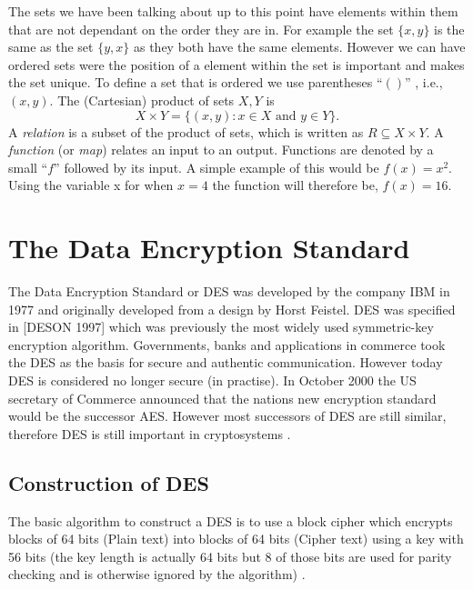 \documentclass[11pt,a4paper]{report}
\begin{document}
The sets we have been talking about up to this point have elements within them that are not dependant on the order they are in. For example the set $\{x,y\}$ is the same as the set $\{y, x\}$ as they both have the same elements. However we can have ordered sets were the position of a element within the set is important and makes the set unique. To define a set that is ordered we use parentheses  ``$()$'' , i.e., $(x,y)$.
The (Cartesian) product of sets $X, Y$ is
\begin{displaymath}
  X \times Y = \{(x,y) : x \in X \text{ and } y \in Y\}.
\end{displaymath}
A \emph{relation} is a subset of the product of sets, which is written as $R \subseteq X \times Y$. A \emph{function} (or \emph{map}) relates an input to an output. Functions are denoted by a small ``$f$'' followed by its input. A simple example of this would be $f(x) = x^2$. Using the variable x for when $x=4$ the function will therefore be, $f(x) = 16$.





\chapter{The Data Encryption Standard}
\label{cha:DES}

The Data Encryption Standard  or DES was developed by the company IBM in 1977 and originally developed from a design by Horst Feistel. DES was specified in [DESON 1997] which was previously the most widely used symmetric-key encryption algorithm. Governments, banks and applications in commerce took the DES as the basis for secure and authentic communication. However today DES is considered no longer secure (in practise). In October 2000 the US secretary of Commerce announced that the nations new encryption standard would be the successor AES. However most successors of DES are still similar, therefore DES is still important in cryptosystems \cite{DBLP:series/isc/DelfsK07} \cite{DBLP:books/sp/Buchmann02}.

\section{Construction of DES}
\label{sec:conDES}
The basic algorithm to construct a DES is to use a block cipher which encrypts blocks of 64 bits (Plain text) into blocks of 64 bits (Cipher text) using a key with 56 bits (the key length is actually 64 bits but 8 of those bits are used for parity checking and is otherwise ignored by the algorithm) \cite{Fabio2000LogicalSAT}.
\end{document}
